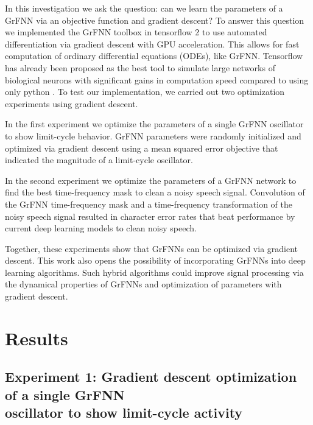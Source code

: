 \documentclass{report}
\begin{document}
In this investigation we ask the question: can we learn the parameters of a GrFNN via an objective function and gradient descent? To answer this question we implemented the GrFNN toolbox in tensorflow 2 to use automated differentiation via gradient descent with GPU acceleration. This allows for fast computation of ordinary differential equations (ODEs), like GrFNN. Tensorflow has already been proposed as the best tool to simulate large networks of biological neurons with significant gains in computation speed compared to using only python \cite{mohanta2019parallel}. To test our implementation, we carried out two optimization experiments using gradient descent.

In the first experiment we optimize the parameters of a single GrFNN oscillator to show limit-cycle behavior. GrFNN parameters were randomly initialized and optimized via gradient descent using a mean squared error objective that indicated the magnitude of a limit-cycle oscillator.

In the second experiment we optimize the parameters of a GrFNN network to find the best time-frequency mask to clean a noisy speech signal. Convolution of the GrFNN time-frequency mask and a time-frequency transformation of the noisy speech signal resulted in character error rates that beat performance by current deep learning models to clean noisy speech. 

Together, these experiments show that GrFNNs can be optimized via gradient descent. This work also opens the possibility of incorporating GrFNNs into deep learning algorithms. Such hybrid algorithms could improve signal processing via the dynamical properties of GrFNNs and optimization of parameters with gradient descent.

\section{Results}

\subsection{Experiment 1: Gradient descent optimization of a single GrFNN \\ oscillator to show limit-cycle activity} 
\end{document}
